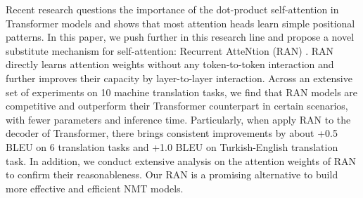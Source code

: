 Recent research questions the importance of the dot-product self-attention in Transformer models and shows that most attention heads learn simple positional patterns. In this paper, we push further in this research line and propose a novel substitute mechanism for self-attention: Recurrent AtteNtion (RAN) . RAN directly learns attention weights without any token-to-token interaction and further improves their capacity by layer-to-layer interaction. Across an extensive set of experiments on 10 machine translation tasks, we find that RAN models are competitive and outperform their Transformer counterpart in certain scenarios, with fewer parameters and inference time. Particularly, when apply RAN to the decoder of Transformer, there brings consistent improvements by about +0.5 BLEU on 6 translation tasks and +1.0 BLEU on Turkish-English translation task. In addition, we conduct extensive analysis on the attention weights of RAN to confirm their reasonableness. Our RAN is a promising alternative to build more effective and efficient NMT models.
